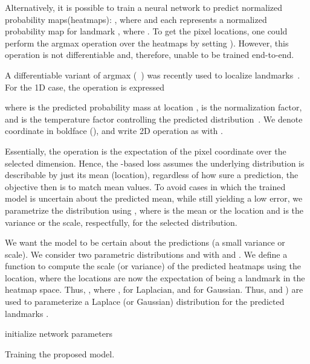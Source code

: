 \documentclass[10pt,twocolumn,letterpaper]{article}
\begin{document}
Alternatively, it is possible to train a neural network to predict normalized probability maps(\ie heatmaps): , where  and each  represents a normalized probability map for landmark , where . To get the pixel locations, one could perform the argmax operation over the heatmaps by setting ). However, this operation is not differentiable and, therefore, unable to be trained end-to-end.


A differentiable variant of argmax (\ie ~\cite{chapelle2010gradient}) was recently used to localize landmarks~\cite{honari2018improving}. For the 1D case, the  operation is expressed 



where  is the predicted probability mass at location ,  is the normalization factor, and  is the temperature factor controlling the predicted distribution~\cite{chapelle2010gradient}. We denote coordinate in boldface (\ie ), and write 2D  operation as  with .


Essentially, the  operation is the expectation of the pixel coordinate over the selected dimension. Hence, the -based loss assumes the underlying distribution is describable by just its mean (\ie location), regardless of how sure a prediction, the objective then is to match mean values. To avoid cases in which the trained model is uncertain about the predicted mean, while still yielding a low error, we parametrize the distribution using , where  is the mean or the location and  is the variance or the scale, respectfully, for the selected distribution.


We want the model to be certain about the predictions (\ie a small variance or scale). We consider two parametric distributions and  with  and . We define a function  to compute the scale (or variance) of the predicted heatmaps  using the location, where the locations are now the expectation of being a landmark in the heatmap space. Thus, , where ,  for Laplacian, and  for Gaussian. Thus,  and ) are used to parameterize a Laplace (or Gaussian) distribution for the predicted landmarks .


\begin{algorithm}[t]
\SetAlgoLined
\KwData{,
        

}
 initialize network parameters\

 \caption{Training the proposed model.}
 \label{alg:training-kl}
 \vspace{2mm}
\end{algorithm}
\end{document}
